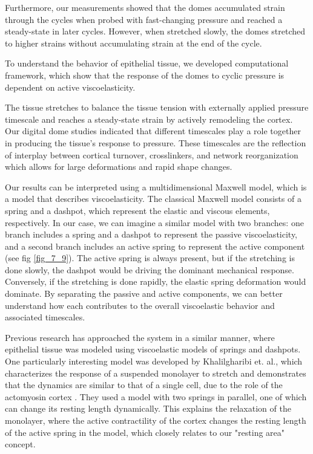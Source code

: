 Furthermore, our measurements showed that the domes accumulated strain through the cycles when probed with fast-changing pressure and reached a steady-state in later cycles. However, when stretched slowly, the domes stretched to higher strains without accumulating strain at the end of the cycle.

To understand the behavior of epithelial tissue, we developed computational framework, which show that the response of the domes to cyclic pressure is dependent on active viscoelasticity.

The tissue stretches to balance the tissue tension with externally applied pressure timescale and reaches a steady-state strain by actively remodeling the cortex. Our digital dome studies indicated that different timescales play a role together in producing the tissue’s response to pressure. These timescales are the reflection of interplay between cortical turnover, crosslinkers, and network reorganization which allows for large deformations and rapid shape changes.

Our results can be interpreted using a multidimensional Maxwell model, which is a model that describes viscoelasticity. The classical Maxwell model consists of a spring and a dashpot, which represent the elastic and viscous elements, respectively. In our case, we can imagine a similar model with two branches: one branch includes a spring and a dashpot to represent the passive viscoelasticity, and a second branch includes an active spring to represent the active component  (see fig \ref{fig_7_9}). The active spring is always present, but if the stretching is done slowly, the dashpot would be driving the dominant mechanical response. Conversely, if the stretching is done rapidly, the elastic spring deformation would dominate. By separating the passive and active components, we can better understand how each contributes to the overall viscoelastic behavior and associated timescales.

Previous research has approached the system in a similar manner, where epithelial tissue was modeled using viscoelastic models of springs and dashpots. One particularly interesting model was developed by Khalilgharibi et. al., which characterizes the response of a suspended monolayer to stretch and demonstrates that the dynamics are similar to that of a single cell, due to the role of the actomyosin cortex \cite{khalilgharibi2019}. They used a model with two springs in parallel, one of which can change its resting length dynamically. This explains the relaxation of the monolayer, where the active contractility of the cortex changes the resting length of the active spring in the model, which closely relates to our "resting area" concept.

